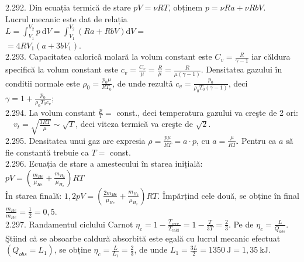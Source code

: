 2.292. Din ecuația termică de stare $p V=\nu R T$, obținem $p=\nu R a+\nu R b V$.\\ Lucrul mecanic este dat de relația\\ $L =\int_{V_{1}}^{V_{2}} p \mathrm{~d} V=\int_{V_{1}}^{V_{2}}(R a+R b V) \mathrm{d} V=$ \\ $=4 R V_{1}\left(a+3 b V_{1}\right)$.\\

2.293. Capacitatea caloricã molară la volum constant este $C_{v}=\frac{R}{\gamma-1}$ iar căldura specifică la volum constant este $c_{v}=\frac{C_{v}}{\mu}=\frac{R}{\mu}=\frac{R}{\mu(\gamma-1)}$. Densitatea gazului în conditii normale este $\rho_{0}=\frac{p_{0} \mu}{R T_{0}}$, de unde rezultǎ $c_{v}=\frac{p_{0}}{\rho_{0} T_{0}(\gamma-1)}$, deci $\gamma=1+\frac{p_{0}}{\rho_{0} T_{0} c_{v}} ;$\\

2.294. La volum constant $\frac{p}{T}=$ const., deci temperatura gazului va creşte de 2 ori: $\quad v_{t}=\sqrt{\frac{3 R T}{\mu}} \sim \sqrt{T}$, deci viteza termică va creşte de $\sqrt{2}$.\\

2.295. Densitatea unui gaz are expresia $\rho=\frac{p \mu}{R T}=a \cdot p$, cu $a=\frac{\mu}{R T}$. Pentru ca $a$ să fie constantă trebuie ca $T=$ const.\\

2.296. Ecuația de stare a amestecului în starea inițială:\\ $p V=\left(\frac{m_{H e}}{\mu_{H e}}+\frac{m_{H_{2}}}{\mu_{H_{2}}}\right) R T$\\ În starea finală: $1,2 p V=\left(\frac{2 m_{H e}}{\mu_{H e}}+\frac{m_{H_{2}}}{\mu_{H_{2}}}\right) R T$. Împărțind cele două, se obține în final $\frac{m_{H e}}{m_{H e}}=\frac{1}{2}=0,5$.\\

2.297. Randamentul ciclului Carnot $\eta_{c}=1-\frac{T_{\text {rece }}}{T_{\text {cald }}}=1-\frac{T}{3 T}=\frac{2}{3}$. Pe de $\eta_{c}=\frac{L}{Q_{a b s}}$. Ştiind că se absoarbe caldură absorbită este egală cu lucrul mecanic efectuat $\left(Q_{o b s}=L_{1}\right)$, se obține $\eta_{c}=\frac{L}{L_{1}}=\frac{2}{3}$, de unde $L_{1}=\frac{3 L}{2}=1350 \mathrm{~J}=1,35 \mathrm{~kJ}$.\\

